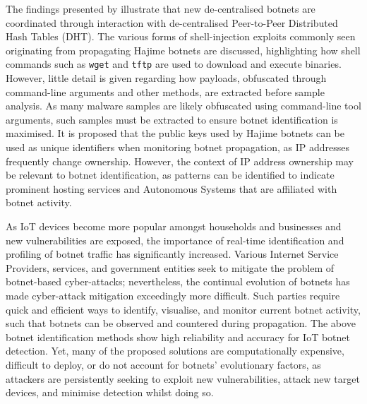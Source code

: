 The findings presented by \citet{Herwig2019} illustrate that new de-centralised botnets are coordinated through interaction with de-centralised Peer-to-Peer Distributed Hash Tables (DHT). The various forms of shell-injection exploits commonly seen originating from propagating Hajime botnets are discussed, highlighting how shell commands such as \texttt{wget} and \texttt{tftp} are used to download and execute binaries. However, little detail is given regarding how payloads, obfuscated through command-line arguments and other methods, are extracted before sample analysis. As many malware samples are likely obfuscated using command-line tool arguments, such samples must be extracted to ensure botnet identification is maximised. It is proposed that the public keys used by Hajime botnets can be used as unique identifiers when monitoring botnet propagation, as IP addresses frequently change ownership. However, the context of IP address ownership may be relevant to botnet identification, as patterns can be identified to indicate prominent hosting services and Autonomous Systems that are affiliated with botnet activity. 

As IoT devices become more popular amongst households and businesses and new vulnerabilities are exposed, the importance of real-time identification and profiling of botnet traffic has significantly increased. Various Internet Service Providers, services, and government entities seek to mitigate the problem of botnet-based cyber-attacks; nevertheless, the continual evolution of botnets has made cyber-attack mitigation exceedingly more difficult. Such parties require quick and efficient ways to identify, visualise, and monitor current botnet activity, such that botnets can be observed and countered during propagation. The above botnet identification methods show high reliability and accuracy for IoT botnet detection. Yet, many of the proposed solutions are computationally expensive, difficult to deploy, or do not account for botnets' evolutionary factors, as attackers are persistently seeking to exploit new vulnerabilities, attack new target devices, and minimise detection whilst doing so. 

